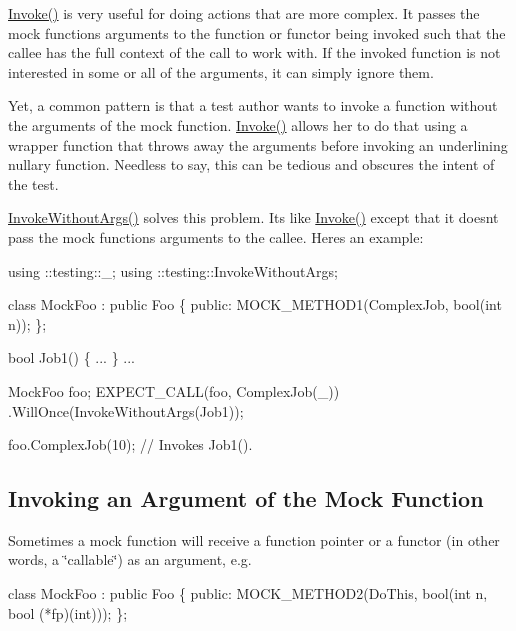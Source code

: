 {\ttfamily \hyperlink{namespacetesting_a12aebaf8363d49a383047529f798b694}{Invoke()}} is very useful for doing actions that are more complex. It passes the mock function\textquotesingle{}s arguments to the function or functor being invoked such that the callee has the full context of the call to work with. If the invoked function is not interested in some or all of the arguments, it can simply ignore them.

Yet, a common pattern is that a test author wants to invoke a function without the arguments of the mock function. {\ttfamily \hyperlink{namespacetesting_a12aebaf8363d49a383047529f798b694}{Invoke()}} allows her to do that using a wrapper function that throws away the arguments before invoking an underlining nullary function. Needless to say, this can be tedious and obscures the intent of the test.

{\ttfamily \hyperlink{namespacetesting_a88cc1999296bc630f6a49cdf66bb21f9}{Invoke\+Without\+Args()}} solves this problem. It\textquotesingle{}s like {\ttfamily \hyperlink{namespacetesting_a12aebaf8363d49a383047529f798b694}{Invoke()}} except that it doesn\textquotesingle{}t pass the mock function\textquotesingle{}s arguments to the callee. Here\textquotesingle{}s an example\+:


\begin{DoxyCode}
using ::testing::\_;
using ::testing::InvokeWithoutArgs;

class MockFoo : public Foo \{
 public:
  MOCK\_METHOD1(ComplexJob, bool(int n));
\};

bool Job1() \{ ... \}
...

  MockFoo foo;
  EXPECT\_CALL(foo, ComplexJob(\_))
      .WillOnce(InvokeWithoutArgs(Job1));

  foo.ComplexJob(10);  // Invokes Job1().
\end{DoxyCode}


\subsection*{Invoking an Argument of the Mock Function}

Sometimes a mock function will receive a function pointer or a functor (in other words, a \char`\"{}callable\char`\"{}) as an argument, e.\+g.


\begin{DoxyCode}
class MockFoo : public Foo \{
 public:
  MOCK\_METHOD2(DoThis, bool(int n, bool (*fp)(int)));
\};
\end{DoxyCode}


